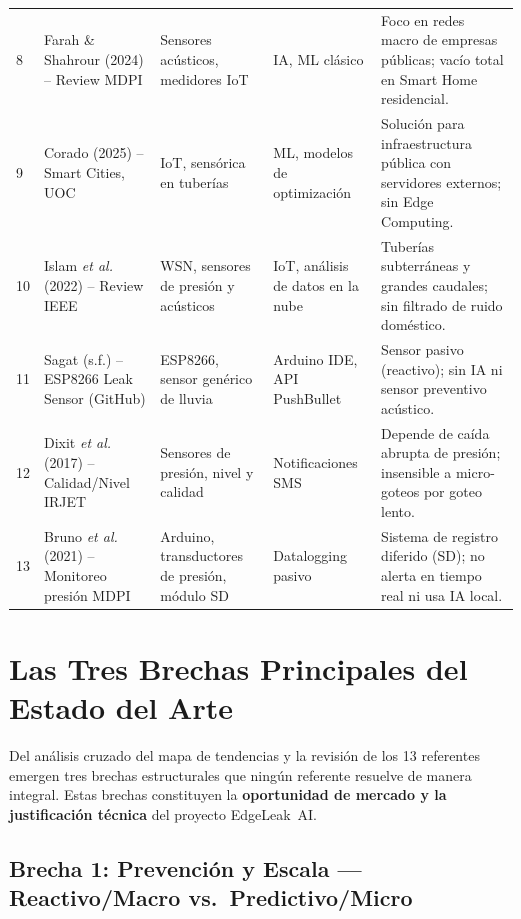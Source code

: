 \documentclass[12pt,a4paper]{article}
\begin{document}
\begin{longtable}{>{\small}p{0.4cm} >{\small}p{3.8cm} >{\small}p{2.4cm} >{\small}p{2.4cm} >{\small}p{4.2cm}}
8 & Farah \& Shahrour (2024) -- Review MDPI & Sensores acústicos, medidores IoT & IA, ML clásico & Foco en redes macro de empresas públicas; vacío total en Smart Home residencial. \\[0.4em]
9 & Corado (2025) -- Smart Cities, UOC & IoT, sensórica en tuberías & ML, modelos de optimización & Solución para infraestructura pública con servidores externos; sin Edge Computing. \\[0.4em]
10 & Islam \textit{et al.} (2022) -- Review IEEE & WSN, sensores de presión y acústicos & IoT, análisis de datos en la nube & Tuberías subterráneas y grandes caudales; sin filtrado de ruido doméstico. \\[0.4em]
11 & Sagat (s.f.) -- ESP8266 Leak Sensor (GitHub) & ESP8266, sensor genérico de lluvia & Arduino IDE, API PushBullet & Sensor pasivo (reactivo); sin IA ni sensor preventivo acústico. \\[0.4em]
12 & Dixit \textit{et al.} (2017) -- Calidad/Nivel IRJET & Sensores de presión, nivel y calidad & Notificaciones SMS & Depende de caída abrupta de presión; insensible a micro-goteos por goteo lento. \\[0.4em]
13 & Bruno \textit{et al.} (2021) -- Monitoreo presión MDPI & Arduino, transductores de presión, módulo SD & Datalogging pasivo & Sistema de registro diferido (SD); no alerta en tiempo real ni usa IA local. \\
\end{longtable}

\newpage

\section{Las Tres Brechas Principales del Estado del Arte}

Del análisis cruzado del mapa de tendencias y la revisión de los 13 referentes emergen
tres brechas estructurales que ningún referente resuelve de manera integral. Estas brechas
constituyen la \textbf{oportunidad de mercado y la justificación técnica} del proyecto
EdgeLeak~AI.

\subsection{Brecha 1: Prevención y Escala --- Reactivo/Macro vs.\ Predictivo/Micro}
\end{document}
